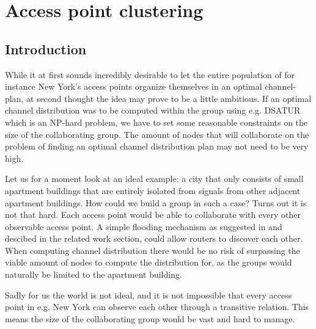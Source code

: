 \chapter{Access point clustering} \label{chap:clustering}



\section{Introduction}
While it at first sounds incredibly desirable to let the entire population of for instance New York's access points organize themselves in an optimal channel-plan,
at second thought the idea may prove to be a little ambitious. If an optimal channel distribution was to be computed within the group using e.g. DSATUR \cite{Brelaz} which
is an NP-hard problem, we have to set some reasonable constraints on the size of the collaborating group. The amount of nodes that will collaborate on the problem of finding an optimal channel distribution plan may not need to be very high.

Let us for a moment look at an ideal example: a city that only consists of small apartment buildings that are entirely isolated from signals from other adjacent apartment buildings.
How could we build a group in such a case? Turns out it is not that hard. Each access point would be able to collaborate with every other observable access point. A simple flooding mechanism
as suggested in \cite{mahonen} and descibed in the related work section, could allow routers to discover each other. When computing channel distribution there would be no risk of surpassing the viable amount of nodes to compute the distribution for, as the groups would naturally be limited to the apartment building.

Sadly for us the world is not ideal, and it is not impossible that every access point in e.g. New York can observe each other through a transitive relation. This means the size of
the collaborating group would be vast and hard to manage. 

